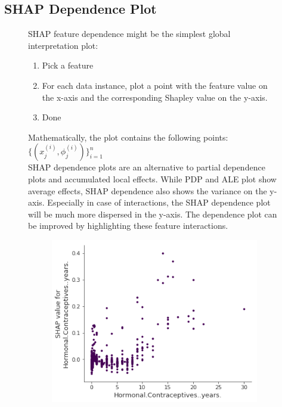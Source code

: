 \subsection{SHAP Dependence Plot}
\begin{figure}[H]
    \centering
    \begin{minipage}{0.40\textwidth}
        SHAP feature dependence might be the simplest global interpretation plot:
        \begin{enumerate}
            \item Pick a feature
            \item For each data instance, plot a point with the feature value on the x-axis and the corresponding Shapley value on the y-axis.
            \item Done\\
        \end{enumerate}

        Mathematically, the plot contains the following points: $\{(x_j^{(i)},\phi_j^{(i)})\}_{i=1}^n$\\

        SHAP dependence plots are an alternative to partial dependence plots and accumulated local effects. While PDP and ALE plot show average effects, SHAP dependence also shows the variance on the y-axis. Especially in case of interactions, the SHAP dependence plot will be much more dispersed in the y-axis. The dependence plot can be improved by highlighting these feature interactions.
    \end{minipage}
    \hfill
    \begin{minipage}{0.55\textwidth}
        \begin{figure}[H]
            \includegraphics[width=\textwidth]{img/shap-dependence.png}
            \centering
        \end{figure}
    \end{minipage}
\end{figure}
\newpage
